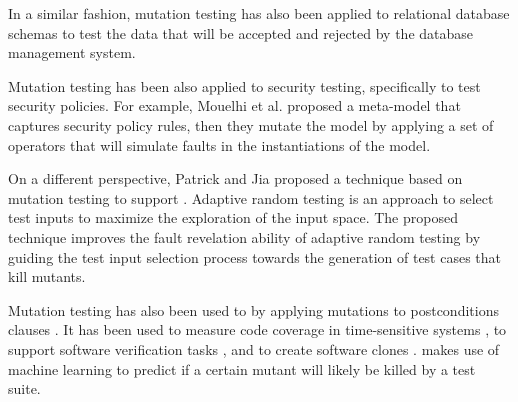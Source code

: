 In a similar fashion, mutation testing has also been applied to relational database schemas \cite{wright2013efficient} to test the data that will be accepted and rejected by the database management system.


Mutation testing has been also applied to security testing, specifically to test security policies. For example, Mouelhi et al. \cite{mouelhiv2008generic} proposed a meta-model that captures security policy rules, then they mutate the model by applying a set of operators that will simulate faults in the instantiations of the model. 

On a different perspective, Patrick and Jia \cite{patrick2015kernel} proposed a technique based on mutation testing to support .
Adaptive random testing is an approach to select test inputs to maximize the exploration of the input space.
The proposed technique improves the fault revelation ability of adaptive random testing by guiding the test input selection process towards the generation of test cases that kill mutants.

Mutation testing has also been used to  by applying mutations to postconditions clauses \cite{galeotti2015inferring}. It has been used to measure code coverage in time-sensitive systems \cite{pankumhang2015iterative}, to support software verification tasks \cite{groce2015verified}, and to create software clones \cite{roy2009mutation}.  \cite{zhang2018predictive} makes use of machine learning to predict if a certain mutant will likely be killed by a test suite.



